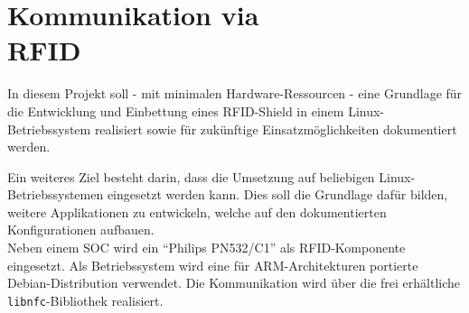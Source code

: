 \documentclass[Bachelorarbeit.tex]{subfiles}
\begin{document}
\section*{Kommunikation via \\ \ac{RFID}}
In diesem Projekt soll - mit minimalen Hardware-Ressourcen - eine Grundlage für die Entwicklung und Einbettung eines RFID-Shield in einem Linux-Betriebssystem realisiert sowie für zukünftige Einsatzmöglichkeiten dokumentiert werden. 
\begin{comment}
Ein weiteres Ziel besteht darin, dass die Umsetzung bis auf die Limitierung, dass ein Linux-Betriebssystem eingesetzt werden soll, Plattform unabhängig ist. 
\end{comment}
Ein weiteres Ziel besteht darin, dass die Umsetzung auf beliebigen Linux-Betriebssystemen eingesetzt werden kann.
Dies soll die Grundlage dafür bilden, weitere Applikationen zu entwickeln, welche auf den dokumentierten Konfigurationen aufbauen. \\
Neben einem \ac{SOC} wird ein "`Philips PN532/C1"' als \ac{RFID}-Komponente eingesetzt.
Als Betriebssystem wird eine für \acs{ARM}-Architekturen portierte Debian-Distribution verwendet. 
Die Kommunikation wird über die frei erhältliche \texttt{libnfc}-Bibliothek realisiert.
\end{document}
